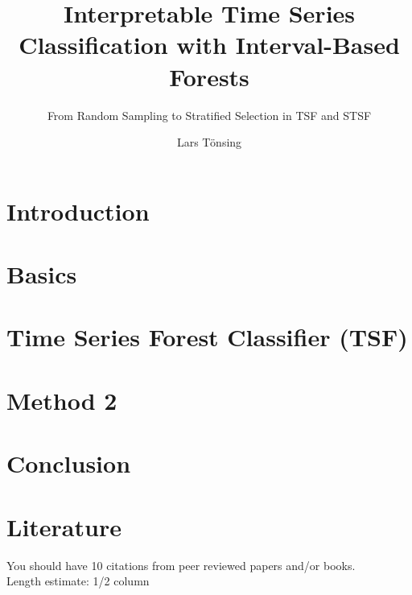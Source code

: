 \documentclass[sigconf,natbib=false]{acmart}
\begin{document}

\title{Interpretable Time Series Classification with Interval-Based Forests}
\subtitle{From Random Sampling to Stratified Selection in TSF and STSF}

\author{Lars Tönsing}


\begin{abstract}

\end{abstract}



\maketitle

\section{Introduction}


\section{Basics}


\section{Time Series Forest Classifier (TSF)}


\section{Method 2}


\section{Conclusion}


\section{Literature}
You should have 10 citations from peer reviewed papers and/or books. \\
Length estimate: 1/2 column
\end{document}
